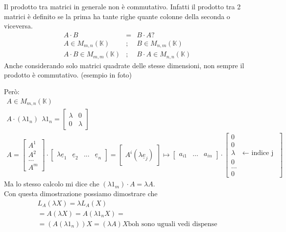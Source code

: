 \begin{osservazione}[]
    Il prodotto tra matrici in generale non è commutativo. Infatti il prodotto tra 2 matrici è definito se la prima ha tante righe quante colonne della seconda o viceversa.
    \begin{align}
        A\cdot B&=&B\cdot A? \\
        A\in M _{m,n}(\mathbb{K})&;&B\in M _{n,m}(\mathbb{K}) \\
        A\cdot B\in M _{m,m}(\mathbb{K})&;&B\cdot A\in M _{n,n}(\mathbb{K})
    \end{align}
    Anche considerando solo matrici quadrate delle stesse dimensioni, non sempre il prodotto è commutativo. (esempio in foto)
\end{osservazione}
Però:
\begin{gather}
    A\in M _{m,n}(\mathbb{K}) \\
    A\cdot (\lambda 1_n)\ \ \lambda 1_n=\begin{bmatrix}
        \lambda & 0 \\
        0 & \lambda
    \end{bmatrix} \\
    A=\begin{bmatrix}
        A^1 \\ A^2 \\...\\ A^m
    \end{bmatrix} \cdot \begin{bmatrix}
    \lambda \underline{e}_1 & \underline{e}_2 & ... & \underline{e}_n
    \end{bmatrix}= \begin{bmatrix}
    A^i(\lambda \underline{e}_j)
    \end{bmatrix}\mapsto \begin{bmatrix}
    a_{i1} & \dots & a _{in}
    \end{bmatrix} \cdot \begin{bmatrix}
    0 \\ 0 \\ \lambda &\leftarrow \text{ indice j }\\ 0 \\\dots \\ 0
    \end{bmatrix}
\end{gather}
Ma lo stesso calcolo mi dice che $(\lambda 1_m)\cdot A=\lambda A$. \\
Con questa dimostrazione possiamo dimostrare che
\begin{gather}
    L_A(\lambda X)=\lambda L_A(X) \\
    =A(\lambda X) = A(\lambda 1_n X)= \\
    =(A(\lambda 1_n))X=(\lambda A)X \text{boh sono uguali vedi dispense}
\end{gather}
